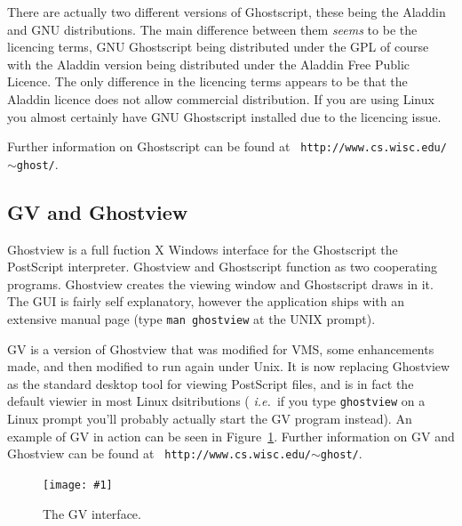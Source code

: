 \documentclass[twoside,11pt]{article}
\newcommand{\htmladdnormallink}[2]{#1}
\newcommand{\htmladdimg}[1]{}
\newcommand{\htmlref}[2]{#1}
\newcommand{\xlabel}[1]{}
\newcommand{\myfig}[5]{
  \begin{figure}
    \centering\texttt{[image: \#1]}
    \typeout{#1 inserted on page \arabic{page}}
    \caption{\label{#4}#5}
  \end{figure}
  }
\newcommand{\myfig}[5]{
    \label{#4} \htmladdimg{#3}\\
    Figure: #5\\
  }
\begin{document}
There are actually two different versions of
\htmladdnormallink{Ghostscript}{http://www.cs.wisc.edu/~ghost/aladdin/index.html},
these being the
\htmladdnormallink{Aladdin}{http://www.cs.wisc.edu/~ghost/aladdin/index.html}
and
\htmladdnormallink{GNU}{http://www.cs.wisc.edu/~ghost/gnu/index.html}
distributions. The main difference between them {\em seems} to be the
licencing terms, GNU Ghostscript being distributed under the
\htmladdnormallink{GPL}{http://www.gnu.org/copyleft/gpl.html} of
course with the Aladdin version being distributed under the
\htmladdnormallink{Aladdin Free Public
Licence}{http://www.cs.wisc.edu/~ghost/aladdin/doc/Public.htm}. The
only difference in the licencing terms appears to be that the Aladdin
licence does not allow commercial distribution. If you are using Linux
you almost certainly have GNU Ghostscript installed due to the
licencing issue.

Further information on Ghostscript can be found at
\htmladdnormallink{{\tt
http://www.cs.wisc.edu/$\sim$ghost/}}{http://www.cs.wisc.edu/~ghost/}.

\subsection{\xlabel{sc15_gv}GV and Ghostview\label{sc15_gv}}

\htmladdnormallink{Ghostview}{http://www.cs.wisc.edu/~ghost/ghostview/index.html}
is a full fuction X Windows interface for the
\htmlref{Ghostscript}{sc15_gs} the PostScript interpreter. Ghostview
and Ghostscript function as two cooperating programs. Ghostview
creates the viewing window and Ghostscript draws in it. The GUI is
fairly self explanatory, however the application ships with an
extensive manual page (type {\tt man ghostview} at the UNIX prompt). 

\htmladdnormallink{GV}{http://www.cs.wisc.edu/~ghost/gv/index.html} is
a version of Ghostview that was modified for VMS, some enhancements
made, and then modified to run again under Unix. It is now replacing
Ghostview as the standard desktop tool for viewing PostScript files,
and is in fact the default viewier in most Linux dsitributions ({\em
i.e.\ }if you type {\tt ghostview} on a Linux prompt you'll probably
actually start the GV program instead). An example of GV in action can
be seen in Figure~\ref{sc15_gv_interface}. Further information on GV
and Ghostview can be found at \htmladdnormallink{{\tt
http://www.cs.wisc.edu/$\sim$ghost/}}{http://www.cs.wisc.edu/~ghost/}.

\myfig{sc15_gv.eps}{height=0.6\textheight}{sc15_gv.gif}{sc15_gv_interface}{The GV interface.} 
\end{document}
